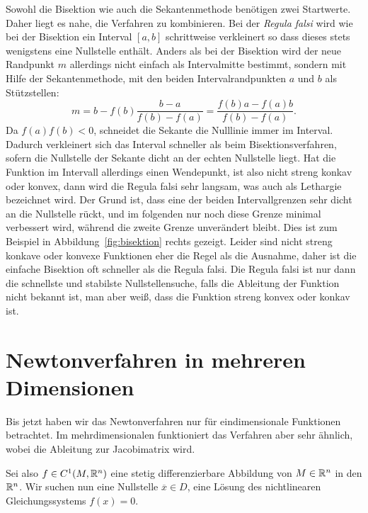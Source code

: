 Sowohl die Bisektion wie auch die Sekantenmethode benötigen zwei
Startwerte. Daher liegt es nahe, die Verfahren zu kombinieren.
Bei der \emph{Regula falsi} wird wie bei der Bisektion ein Interval
$[a,b]$ schrittweise verkleinert so dass dieses stets wenigstens eine
Nullstelle enthält. Anders als bei der Bisektion wird der neue
Randpunkt $m$ allerdings nicht einfach als Intervalmitte bestimmt,
sondern mit Hilfe der Sekantenmethode, mit den beiden
Intervalrandpunkten $a$ und $b$ als Stützstellen:
\begin{equation}
  m = b - f(b)\frac{b - a}{f(b) - f(a)} =
  \frac{f(b)a - f(a)b}{f(b) - f(a)}.
\end{equation}
Da $f(a)f(b)<0$, schneidet die Sekante die Nulllinie immer im
Interval.  Dadurch verkleinert sich das Interval schneller als beim
Bisektionsverfahren, sofern die Nullstelle der Sekante dicht an der
echten Nullstelle liegt. Hat die Funktion im Intervall allerdings
einen Wendepunkt, ist also nicht streng konkav oder konvex, dann wird
die Regula falsi sehr langsam, was auch als Lethargie bezeichnet
wird. Der Grund ist, dass eine der beiden Intervallgrenzen sehr dicht
an die Nullstelle rückt, und im folgenden nur noch diese Grenze
minimal verbessert wird, während die zweite Grenze unverändert
bleibt. Dies ist zum Beispiel in Abbildung~\ref{fig:bisektion} rechts
gezeigt. Leider sind nicht streng konkave oder konvexe Funktionen eher
die Regel als die Ausnahme, daher ist die einfache Bisektion oft
schneller als die Regula falsi.  Die Regula falsi ist nur dann die
schnellste und stabilste Nullstellensuche, falls die Ableitung der
Funktion nicht bekannt ist, man aber weiß, dass die Funktion streng
konvex oder konkav ist.

\section{Newtonverfahren in mehreren Dimensionen}

Bis jetzt haben wir das Newtonverfahren nur für eindimensionale
Funktionen betrachtet. Im mehrdimensionalen funktioniert das Verfahren
aber sehr ähnlich, wobei die Ableitung zur Jacobimatrix wird.

Sei also $f\in C^1(M, \mathbb{R}^n)$ eine stetig differenzierbare Abbildung
von $M\in\mathbb{R}^n$ in den $\mathbb{R}^n$. Wir suchen nun eine Nullstelle
$\overline{x}\in D$, \dh eine Lösung des nichtlinearen
Gleichungssystems $f(x) = 0$.

